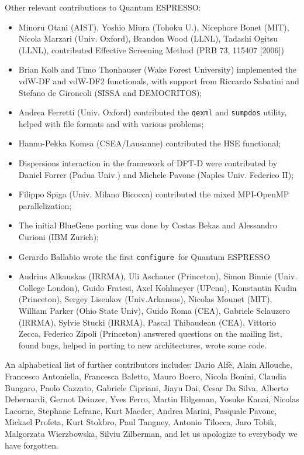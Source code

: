 \documentclass[12pt,a4paper]{article}
\def\qe{{\sc Quantum ESPRESSO}}
\def\configure{\texttt{configure}}
\begin{document}
Other relevant contributions to \qe:
\begin{itemize}
  \item Minoru Otani (AIST), Yoshio Miura (Tohoku U.), 
  Nicephore Bonet (MIT), Nicola Marzari (Univ. Oxford), 
  Brandon Wood (LLNL), Tadashi Ogitsu (LLNL), contributed
  Effective Screening Method (PRB 73, 115407 [2006])
  \item Brian Kolb and Timo Thonhauser (Wake Forest University)
  implemented the vdW-DF and vdW-DF2 functionals, with support from
  Riccardo Sabatini and Stefano de Gironcoli (SISSA and DEMOCRITOS);
  \item Andrea Ferretti (Univ. Oxford) contributed the \texttt{qexml} and
  \texttt{sumpdos} utility,
  helped with file formats and with various problems;
  \item Hannu-Pekka Komsa (CSEA/Lausanne) contributed
  the HSE functional;
  \item Dispersions interaction in the framework of DFT-D were
  contributed by Daniel Forrer (Padua Univ.) and Michele Pavone
  (Naples Univ. Federico II);
 \item Filippo Spiga (Univ. Milano Bicocca) contributed the
  mixed MPI-OpenMP parallelization;
  \item The initial BlueGene porting was done by Costas Bekas and
  Alessandro Curioni (IBM Zurich);
  \item Gerardo Ballabio wrote the first \configure\ for \qe
  \item Audrius Alkauskas (IRRMA), Uli Aschauer (Princeton),
Simon Binnie (Univ. College London), Guido Fratesi, Axel Kohlmeyer (UPenn),
Konstantin Kudin (Princeton), Sergey Lisenkov (Univ.Arkansas), 
Nicolas Mounet (MIT), William Parker (Ohio State Univ), 
Guido Roma (CEA), Gabriele Sclauzero (IRRMA), Sylvie Stucki (IRRMA), 
Pascal Thibaudeau (CEA), Vittorio Zecca, Federico Zipoli (Princeton)
answered questions on the mailing list, found bugs, helped in 
porting to new architectures, wrote some code.
\end{itemize}

An alphabetical list of further contributors includes: Dario Alf\`e, 
Alain Allouche, Francesco Antoniella, Francesca Baletto,
Mauro Boero, Nicola Bonini, Claudia Bungaro, 
Paolo Cazzato, Gabriele Cipriani, Jiayu Dai, Cesar Da Silva, 
Alberto Debernardi, Gernot Deinzer, Yves Ferro,
Martin Hilgeman,  Yosuke Kanai, Nicolas Lacorne, Stephane Lefranc,
Kurt Maeder, Andrea Marini, 
Pasquale Pavone,  Mickael Profeta, Kurt Stokbro, 
Paul Tangney, 
Antonio Tilocca, Jaro Tobik, 
Malgorzata Wierzbowska, Silviu Zilberman, 
and let us apologize to everybody we have forgotten.
 
\end{document}
